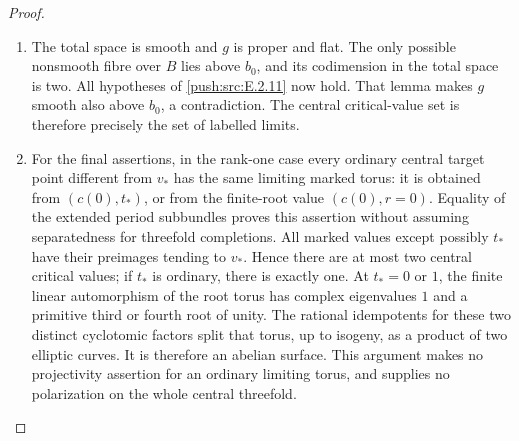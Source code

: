 \begin{proof}
\begin{enumerate}[label={$\langle1\rangle$\arabic*.},leftmargin=*]
\item The total space is smooth and $g$ is proper and flat.
The only possible nonsmooth fibre over $B$ lies above
$b_0$, and its codimension in the total space is two.
All hypotheses of \ref{push:src:E.2.11} now hold.  That lemma makes
$g$ smooth also above $b_0$, a contradiction.  The
central critical-value set is therefore precisely
the set of labelled limits.

\item For the final assertions, in the rank-one case every
ordinary central target point different from $v_*$
has the same limiting marked torus: it is obtained
from $(c(0),t_*)$, or from the finite-root value
$(c(0),r=0)$.  Equality of the extended period
subbundles proves this assertion without assuming
separatedness for threefold completions.
All marked values except possibly $t_*$ have their
preimages tending to $v_*$.  Hence there are at most
two central critical values; if $t_*$ is ordinary,
there is exactly one.
At $t_*=0$ or $1$, the finite linear automorphism of
the root torus has complex eigenvalues $1$ and a
primitive third or fourth root of unity.  The
rational idempotents for these two distinct
cyclotomic factors split that torus, up to isogeny,
as a product of two elliptic curves.  It is therefore
an abelian surface.  This argument makes no
projectivity assertion for an ordinary limiting
torus, and supplies no polarization on the whole
central threefold.

\end{enumerate}
\end{proof}

